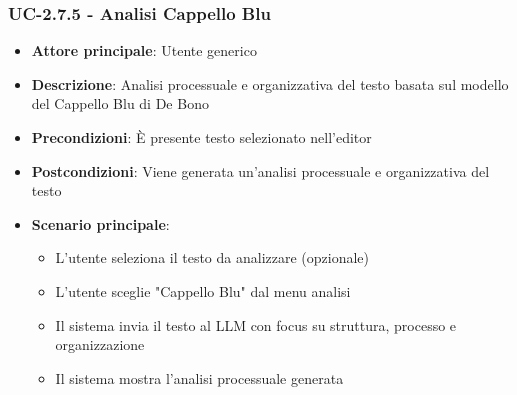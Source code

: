 \documentclass[11pt,a4paper]{article}
\begin{document}
\subsubsection{UC-2.7.5 - Analisi Cappello Blu}
\begin{itemize}
    \item \textbf{Attore principale}: Utente generico
    \item \textbf{Descrizione}: Analisi processuale e organizzativa del testo basata sul modello del Cappello Blu di De Bono
    \item \textbf{Precondizioni}: È presente testo selezionato nell'editor
    \item \textbf{Postcondizioni}: Viene generata un'analisi processuale e organizzativa del testo
    \item \textbf{Scenario principale}:
        \begin{itemize}
            \item L'utente seleziona il testo da analizzare (opzionale)
            \item L'utente sceglie "Cappello Blu" dal menu analisi
            \item Il sistema invia il testo al LLM con focus su struttura, processo e organizzazione
            \item Il sistema mostra l'analisi processuale generata
        \end{itemize}
\end{itemize}
\end{document}
